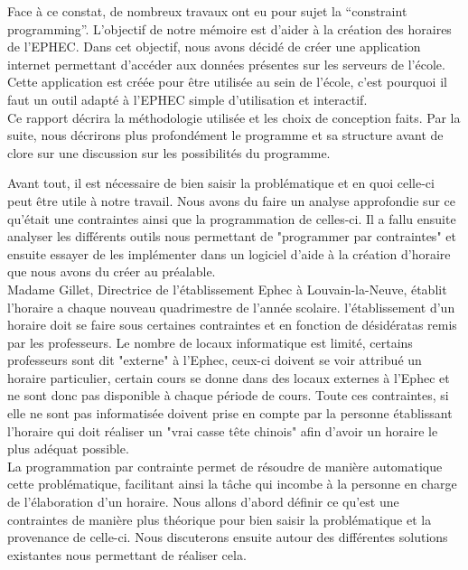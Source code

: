Face à ce constat, de nombreux travaux ont eu pour sujet la \enquote{constraint programming}. 
\newline
\indent
L'objectif de notre mémoire est d'aider à la création des horaires de l'EPHEC.
Dans cet objectif, nous avons décidé de créer une application internet permettant d'accéder
aux données présentes sur les serveurs de l'école.\\
\newline
\indent
Cette application est créée pour être utilisée au sein de l'école, c'est pourquoi il faut un 
outil adapté à l'EPHEC simple d'utilisation et interactif. \\
\newline
\indent
Ce rapport décrira la méthodologie utilisée et les choix de conception faits.
Par la suite, nous décrirons plus profondément le programme et sa structure avant de clore sur une discussion sur les possibilités du programme. 


Avant tout, il est nécessaire de bien saisir la problématique et en quoi celle-ci peut être utile à notre travail. Nous avons du faire un analyse approfondie sur ce qu'était une contraintes ainsi que la programmation de celles-ci. Il a fallu ensuite analyser les différents outils nous permettant de "programmer par contraintes" et ensuite essayer de les implémenter dans un logiciel d'aide à la création d'horaire que nous avons du créer au préalable.\\
\newline
\indent
Madame Gillet, Directrice de l'établissement Ephec à Louvain-la-Neuve, établit l'horaire a chaque nouveau quadrimestre de l'année scolaire. l'établissement d'un horaire doit se faire sous certaines contraintes et en fonction de désidératas remis par les professeurs. Le nombre de locaux informatique est limité, certains professeurs sont dit "externe" à l'Ephec, ceux-ci doivent se voir attribué un horaire particulier, certain cours se donne dans des locaux externes à l'Ephec et ne sont donc pas disponible à chaque période de cours. Toute ces contraintes, si elle ne sont pas informatisée doivent prise en compte par la personne établissant l'horaire qui doit réaliser un "vrai casse tête chinois" afin d'avoir un horaire le plus adéquat possible.\\
\newline
\indent
La programmation par contrainte permet de résoudre de manière automatique cette problématique, facilitant ainsi la tâche qui incombe à la personne en charge de l'élaboration d'un horaire. Nous allons d'abord définir ce qu'est une contraintes de manière plus théorique pour bien saisir la problématique et la provenance de celle-ci. Nous discuterons ensuite autour des différentes solutions existantes nous permettant de réaliser cela.


